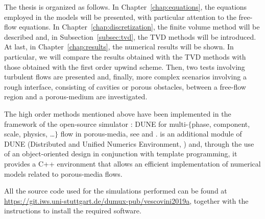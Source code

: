 The thesis is organized as follows. In Chapter~\ref{chap:equations}, the equations employed in the models will be 
presented, with particular attention to the free-flow equations. In 
Chapter~\ref{chap:discretization}, the finite volume method will be described 
and, in Subsection~\ref{subsec:tvd}, the TVD methods will be introduced. At last, 
in Chapter~\ref{chap:results}, the numerical results will be shown. In 
particular, we will
compare the results obtained with the TVD methods with those obtained with
the first order upwind scheme. Then, two tests 
involving turbulent flows are presented and, finally, more complex scenarios involving 
a rough interface, consisting of cavities or porous obstacles, between a 
free-flow region and a porous-medium are investigated.

The high order methods mentioned above have been implemented in the framework 
of the open-source simulator \DUMUX: DUNE for multi-$\{$phase, component, 
scale, physics, \dots$\}$ flow in porous-media, see \cite{dumux:tutti} and 
\cite{dumux:flemisch}. \DUMUX is an 
additional module of DUNE (Distributed and Unified Numerics Environment, 
\cite{web:dune}) and, through the use of an object-oriented design in 
conjunction with template programming, it provides a C++ environment that 
allows an efficient implementation of numerical models related to porous-media 
flows.

All the source code used for the simulations performed can be 
found at \url{https://git.iws.uni-stuttgart.de/dumux-pub/vescovini2019a}, 
together with the instructions to install the required software.